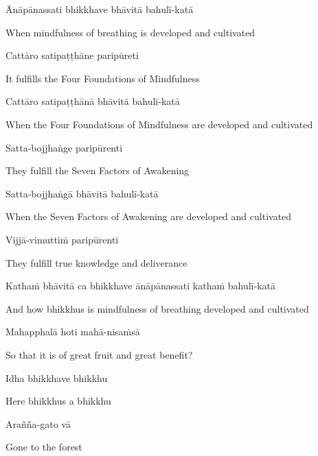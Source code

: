 Ānāpānassati bhikkhave bhāvitā bahulī-katā

\begin{english}
  When mindfulness of breathing is developed and cultivated
\end{english}

Cattāro satipaṭṭhāne paripūreti

\begin{english}
  It fulfills the Four Foundations of Mindfulness
\end{english}

Cattāro satipaṭṭhānā bhāvitā bahulī-katā

\begin{english}
  When the Four Foundations of Mindfulness are developed and cultivated
\end{english}

Satta-bojjhaṅge paripūrenti

\begin{english}
  They fulfill the Seven Factors of Awakening
\end{english}

Satta-bojjhaṅgā bhāvitā bahulī-katā

\begin{english}
  When the Seven Factors of Awakening are developed and cultivated
\end{english}

Vijjā-vimuttiṁ paripūrenti

\begin{english}
  They fulfill true knowledge and deliverance
\end{english}

Kathaṁ bhāvitā ca bhikkhave ānāpānassati kathaṁ bahulī-katā

\begin{english}
  And how bhikkhus is mindfulness of breathing developed and cultivated
\end{english}

Mahapphalā hoti mahā-nisaṁsā

\begin{english}
  So that it is of great fruit and great benefit?
\end{english}

Idha bhikkhave bhikkhu

\begin{english}
  Here bhikkhus a bhikkhu
\end{english}

Arañña-gato vā

\begin{english}
  Gone to the forest
\end{english}

